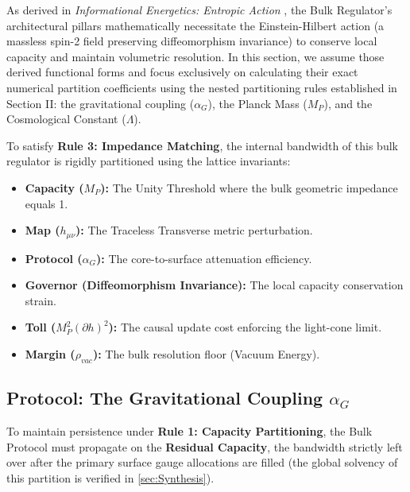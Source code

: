 As derived in \textit{Informational Energetics: Entropic Action} \cite{meyer_ieaction_2026}, the Bulk Regulator's architectural pillars mathematically necessitate the Einstein-Hilbert action (a massless spin-2 field preserving diffeomorphism invariance) to conserve local capacity and maintain volumetric resolution. In this section, we assume those derived functional forms and focus exclusively on calculating their exact numerical partition coefficients using the nested partitioning rules established in Section II: the gravitational coupling ($\alpha_G$), the Planck Mass ($M_P$), and the Cosmological Constant ($\Lambda$).

To satisfy \textbf{Rule 3: Impedance Matching}, the internal bandwidth of this bulk regulator is rigidly partitioned using the lattice invariants:

\begin{itemize}
    \item \textbf{Capacity ($M_P$):} The Unity Threshold where the bulk geometric impedance equals 1.
    \item \textbf{Map ($h_{\mu\nu}$):} The Traceless Transverse metric perturbation.
    \item \textbf{Protocol ($\alpha_G$):} The core-to-surface attenuation efficiency.
    \item \textbf{Governor (Diffeomorphism Invariance):} The local capacity conservation strain.
    \item \textbf{Toll ($M_P^2 (\partial h)^2$):} The causal update cost enforcing the light-cone limit.
    \item \textbf{Margin ($\rho_{vac}$):} The bulk resolution floor (Vacuum Energy).
\end{itemize}

\subsection{Protocol: The Gravitational Coupling \texorpdfstring{$\alpha_G$}{alphaG}}
To maintain persistence under \textbf{Rule 1: Capacity Partitioning}, the Bulk Protocol must propagate on the \textbf{Residual Capacity}, the bandwidth strictly left over after the primary surface gauge allocations are filled (the global solvency of this partition is verified in \cref{sec:Synthesis}).

